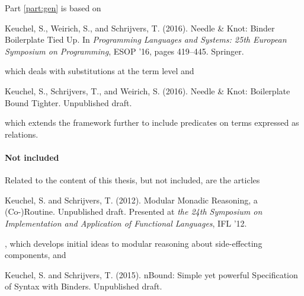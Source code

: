 {Part \ref{part:gen} is based on

\begin{center}
  \begin{minipage}{0.85\columnwidth}
    Keuchel, S., Weirich, S., and Schrijvers, T. (2016).
    \newblock Needle {\&} {K}not: {B}inder {B}oilerplate {T}ied {U}p.
    \newblock In {\em Programming Languages and Systems: 25th European Symposium
      on Programming}, ESOP '16, pages 419--445. Springer.
  \end{minipage}
\end{center}
\noindent which deals with substitutions at the term level and
\begin{center}
  \begin{minipage}{0.85\columnwidth}
    Keuchel, S.,  Schrijvers, T., and Weirich, S. (2016).
    \newblock Needle {\&} {K}not: {B}oilerplate {B}ound {T}ighter.
    \newblock Unpublished draft.
  \end{minipage}
\end{center}
\noindent which extends the framework further to include predicates on terms
expressed as relations.


\paragraph{Not included}

Related to the content of this thesis, but not included, are the articles

\begin{center}
  \begin{minipage}{0.85\columnwidth}
    Keuchel, S. and Schrijvers, T. (2012).
    \newblock Modular Monadic Reasoning, a (Co-)Routine.
    \newblock Unpublished draft.
    \newblock Presented at \emph{the 24th Symposium on Implementation and
      Application of Functional Languages}, IFL '12.
  \end{minipage}
\end{center},
\noindent which develops initial ideas to modular reasoning about side-effecting
components, and

\begin{center}
  \begin{minipage}{0.85\columnwidth}
    Keuchel, S. and Schrijvers, T. (2015).
    n{B}ound: {S}imple yet powerful {S}pecification of {S}yntax
      with {B}inders.
    \newblock Unpublished draft.
  \end{minipage}
\end{center}

}
